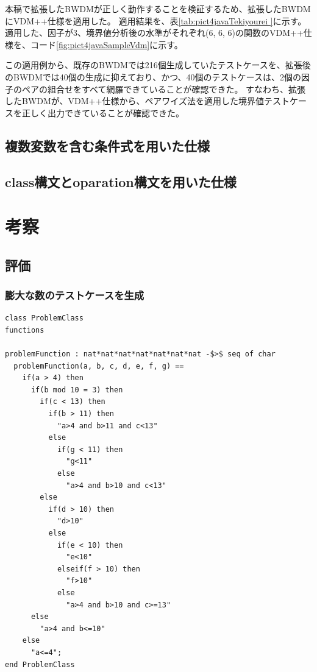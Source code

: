 \documentclass[uplatex, report, a4j, 10pt]{jsbook}
\begin{document}
本稿で拡張したBWDMが正しく動作することを検証するため、拡張したBWDMにVDM++仕様を適用した。
適用結果を、表\ref{tab:pict4javaTekiyourei }に示す。
適用した、因子が3、境界値分析後の水準がそれぞれ(6, 6, 6)の関数のVDM++仕様を、コード\ref{fig:pict4javaSampleVdm}に示す。

この適用例から、既存のBWDMでは216個生成していたテストケースを、拡張後のBWDMでは40個の生成に抑えており、かつ、40個のテストケースは、2個の因子のペアの組合せをすべて網羅できていることが確認できた。
すなわち、拡張したBWDMが、VDM++仕様から、ペアワイズ法を適用した境界値テストケースを正しく出力できていることが確認できた。


\section{複数変数を含む条件式を用いた仕様}
\section{class構文とoparation構文を用いた仕様}

\chapter{考察}\label{cha:Evaluation}
\section{評価}
\subsection{膨大な数のテストケースを生成}
\lstset{language=}
\begin{lstlisting}[caption=因子が7、水準が（6 8 6 8 8 6 6）の関数を持つVDM++仕様。,label=fig:pict4javaIndication]
class ProblemClass
functions

problemFunction : nat*nat*nat*nat*nat*nat*nat -$>$ seq of char
  problemFunction(a, b, c, d, e, f, g) ==
    if(a > 4) then
      if(b mod 10 = 3) then
        if(c < 13) then
          if(b > 11) then
            "a>4 and b>11 and c<13"
          else
            if(g < 11) then
              "g<11"
            else
              "a>4 and b>10 and c<13"
        else
          if(d > 10) then
            "d>10"
          else
            if(e < 10) then
              "e<10"
            elseif(f > 10) then
              "f>10"
            else
              "a>4 and b>10 and c>=13"
      else
        "a>4 and b<=10"
    else
      "a<=4";
end ProblemClass
\end{lstlisting}
\end{document}
